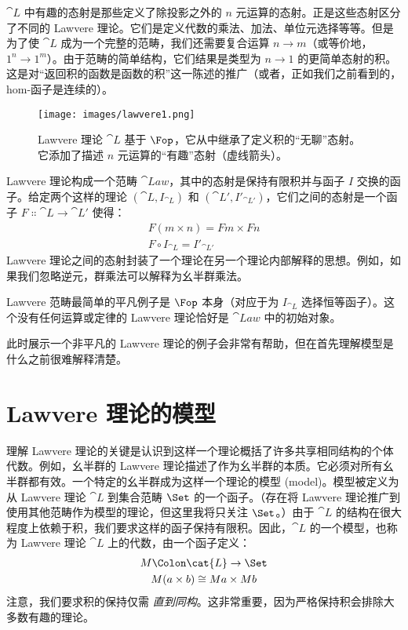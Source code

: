 $\cat{L}$ 中有趣的态射是那些定义了除投影之外的 $n$ 元运算的态射。正是这些态射区分了不同的 Lawvere 理论。它们是定义代数的乘法、加法、单位元选择等等。但是为了使 $\cat{L}$ 成为一个完整的范畴，我们还需要复合运算 $n \to m$（或等价地，$1^n \to 1^m$）。由于范畴的简单结构，它们结果是类型为 $n \to 1$ 的更简单态射的积。这是对“返回积的函数是函数的积”这一陈述的推广（或者，正如我们之前看到的，hom-函子是连续的）。

\begin{figure}[H]
  \centering
  \texttt{[image: images/lawvere1.png]}
  \caption{Lawvere 理论 $\cat{L}$ 基于 $\Fop$，它从中继承了定义积的“无聊”态射。它添加了描述 $n$ 元运算的“有趣”态射（虚线箭头）。}
\end{figure}

Lawvere 理论构成一个范畴 $\cat{Law}$，其中的态射是保持有限积并与函子 $I$ 交换的函子。给定两个这样的理论 $(\cat{L}, I_{\cat{L}})$ 和 $(\cat{L'}, I'_{\cat{L'}})$，它们之间的态射是一个函子 $F \Colon \cat{L} \to \cat{L'}$ 使得：
\begin{gather*}
  F (m \times n) = F m \times F n \\
  F \circ I_{\cat{L}} = I'_{\cat{L'}}
\end{gather*}
Lawvere 理论之间的态射封装了一个理论在另一个理论内部解释的思想。例如，如果我们忽略逆元，群乘法可以解释为幺半群乘法。

Lawvere 范畴最简单的平凡例子是 $\Fop$ 本身（对应于为 $I_{\cat{L}}$ 选择恒等函子）。这个没有任何运算或定律的 Lawvere 理论恰好是 $\cat{Law}$ 中的初始对象。

此时展示一个非平凡的 Lawvere 理论的例子会非常有帮助，但在首先理解模型是什么之前很难解释清楚。

\section{Lawvere 理论的模型}

理解 Lawvere 理论的关键是认识到这样一个理论概括了许多共享相同结构的个体代数。例如，幺半群的 Lawvere 理论描述了作为幺半群的本质。它必须对所有幺半群都有效。一个特定的幺半群成为这样一个理论的模型 (model)。模型被定义为从 Lawvere 理论 $\cat{L}$ 到集合范畴 $\Set$ 的一个函子。（存在将 Lawvere 理论推广到使用其他范畴作为模型的理论，但这里我将只关注 $\Set$。）由于 $\cat{L}$ 的结构在很大程度上依赖于积，我们要求这样的函子保持有限积。因此，$\cat{L}$ 的一个模型，也称为 Lawvere 理论 $\cat{L}$ 上的代数，由一个函子定义：
\begin{gather*}
  M \Colon \cat{L} \to \Set \\
  M (a \times b) \cong M a \times M b
\end{gather*}
注意，我们要求积的保持仅需 \emph{直到同构}。这非常重要，因为严格保持积会排除大多数有趣的理论。

